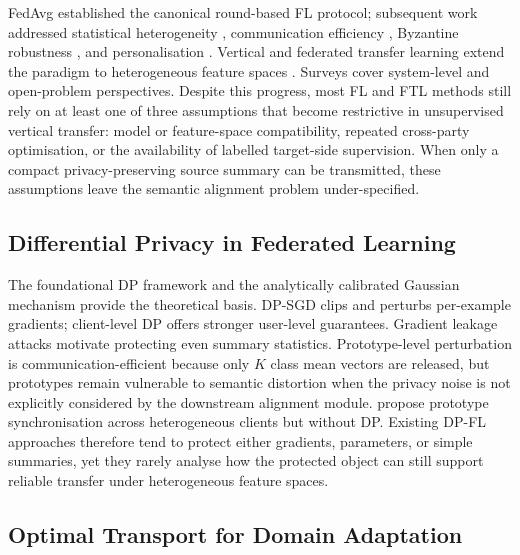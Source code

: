\documentclass[a4paper,fleqn]{cas-sc}
\begin{document}
FedAvg \citep{McMahan2017} established the canonical round-based FL
protocol; subsequent work addressed statistical heterogeneity
\citep{Li2020FedProx,Zhao2018FL,Karimireddy2020}, communication
efficiency \citep{Konecny2016}, Byzantine robustness \citep{Blanchard2017},
and personalisation \citep{Fallah2020,Ghosh2020,Li2021Moon,Yurochkin2019}.
Vertical and federated transfer learning extend the paradigm to
heterogeneous feature spaces \citep{Yang2019,Liu2020FTL,Liu2024}.
Surveys cover system-level \citep{Li2023DPFL} and open-problem
\citep{Kairouz2021} perspectives.
Despite this progress, most FL and FTL methods still rely on at least one of
three assumptions that become restrictive in unsupervised vertical transfer:
model or feature-space compatibility, repeated cross-party optimisation, or
the availability of labelled target-side supervision.
When only a compact privacy-preserving source summary can be transmitted,
these assumptions leave the semantic alignment problem under-specified.

\subsection{Differential Privacy in Federated Learning}

The foundational DP framework \citep{Dwork2014} and the analytically
calibrated Gaussian mechanism \citep{Balle2018} provide the theoretical
basis.
DP-SGD \citep{Abadi2016} clips and perturbs per-example gradients;
client-level DP \citep{Geyer2018,McMahan2018DP} offers stronger
user-level guarantees.
Gradient leakage attacks \citep{Zhu2019} motivate protecting even
summary statistics.
Prototype-level perturbation is communication-efficient because only
$K$ class mean vectors are released, but prototypes remain vulnerable to
semantic distortion when the privacy noise is not explicitly considered by
the downstream alignment module.
\citet{Tan2022Proto} propose prototype synchronisation across heterogeneous
clients but without DP.
Existing DP-FL approaches therefore tend to protect either gradients,
parameters, or simple summaries, yet they rarely analyse how the protected
object can still support reliable transfer under heterogeneous feature
spaces.

\subsection{Optimal Transport for Domain Adaptation}
\end{document}
